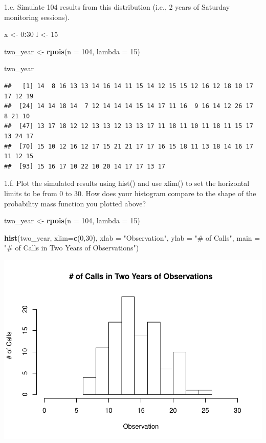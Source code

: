 \documentclass[]{article}
\newenvironment{Shaded}{\begin{snugshade}}{\end{snugshade}}
\newcommand{\KeywordTok}[1]{\textcolor[rgb]{0.13,0.29,0.53}{\textbf{#1}}}
\newcommand{\DataTypeTok}[1]{\textcolor[rgb]{0.13,0.29,0.53}{#1}}
\newcommand{\DecValTok}[1]{\textcolor[rgb]{0.00,0.00,0.81}{#1}}
\newcommand{\StringTok}[1]{\textcolor[rgb]{0.31,0.60,0.02}{#1}}
\newcommand{\OperatorTok}[1]{\textcolor[rgb]{0.81,0.36,0.00}{\textbf{#1}}}
\newcommand{\NormalTok}[1]{#1}
\begin{document}
1.e. Simulate 104 results from this distribution (i.e., 2 years of
Saturday monitoring sessions).

\begin{Shaded}
\begin{Highlighting}[]
\NormalTok{x <-}\StringTok{ }\DecValTok{0}\OperatorTok{:}\DecValTok{30}
\NormalTok{l <-}\StringTok{ }\DecValTok{15}

\NormalTok{two_year <-}\StringTok{ }\KeywordTok{rpois}\NormalTok{(}\DataTypeTok{n =} \DecValTok{104}\NormalTok{, }\DataTypeTok{lambda =} \DecValTok{15}\NormalTok{)}


\NormalTok{two_year}
\end{Highlighting}
\end{Shaded}

\begin{verbatim}
##   [1] 14  8 16 13 13 14 16 14 11 15 14 12 15 15 12 16 12 18 10 17 17 12 19
##  [24] 14 14 18 14  7 12 14 14 14 15 14 17 11 16  9 16 14 12 26 17  8 21 10
##  [47] 13 17 18 12 12 13 13 12 13 13 17 11 18 11 10 11 18 11 15 17 13 24 17
##  [70] 15 10 12 16 12 17 15 21 21 17 17 16 15 18 11 13 18 14 16 17 11 12 15
##  [93] 15 16 17 10 22 10 20 14 17 17 13 17
\end{verbatim}

1.f. Plot the simulated results using hist() and use xlim() to set the
horizontal limits to be from 0 to 30. How does your histogram compare to
the shape of the probability mass function you plotted above?

\begin{Shaded}
\begin{Highlighting}[]
\NormalTok{two_year <-}\StringTok{ }\KeywordTok{rpois}\NormalTok{(}\DataTypeTok{n =} \DecValTok{104}\NormalTok{, }\DataTypeTok{lambda =} \DecValTok{15}\NormalTok{)}

\KeywordTok{hist}\NormalTok{(two_year, }\DataTypeTok{xlim=}\KeywordTok{c}\NormalTok{(}\DecValTok{0}\NormalTok{,}\DecValTok{30}\NormalTok{), }\DataTypeTok{xlab =} \StringTok{"Observation"}\NormalTok{, }\DataTypeTok{ylab =} \StringTok{"# of Calls"}\NormalTok{, }\DataTypeTok{main =} \StringTok{"# of Calls in Two Years of Observations"}\NormalTok{)}
\end{Highlighting}
\end{Shaded}

\includegraphics{Locker-Angelina-ADA-Homework-02_files/figure-latex/unnamed-chunk-7-1.pdf}
\end{document}
